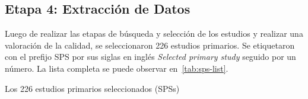 \subsection{Etapa 4: Extracción de Datos}
Luego de realizar las etapas de búsqueda y selección de los estudios y realizar una valoración de la calidad, se seleccionaron 226 estudios primarios. Se etiquetaron con el prefijo SPS por sus siglas en inglés \textit{Selected primary study} seguido por un número. La lista completa se puede observar en~\ref{tab:sps-list}.

\begin{table*}[htbp]
\centering
\footnotesize
\caption{Los 226 estudios primarios seleccionados (SPSs)}\label{tab:sps-list}

\renewcommand{\arraystretch}{1.3} %


\end{table*}
